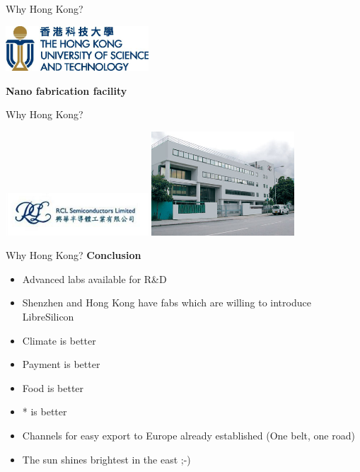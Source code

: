 \documentclass[aspectratio=169]{beamer}
\begin{document}
\begin{frame}{Why Hong Kong?}
	\begin{center}
		\includegraphics[width=0.4\textwidth]{images/u=3232688716,3661225619&fm=26&gp=0.jpg}
		
		\textbf{Nano fabrication facility}
	\end{center}
\end{frame}

\begin{frame}{Why Hong Kong?}
	\begin{center}
		\includegraphics[width=0.4\textwidth]{images/RCL.jpg}
		\includegraphics[width=0.4\textwidth]{images/factory.jpg}
	\end{center}
\end{frame}

\begin{frame}{Why Hong Kong?}
	\textbf{Conclusion}
	\begin{itemize}
		\item Advanced labs available for R\&D
		\item Shenzhen and Hong Kong have fabs which are willing to introduce LibreSilicon
		\item Climate is better
		\item Payment is better
		\item Food is better
		\item * is better
		\item Channels for easy export to Europe already established (One belt, one road)
		\item The sun shines brightest in the east ;-)
	\end{itemize}
\end{frame}
\end{document}
